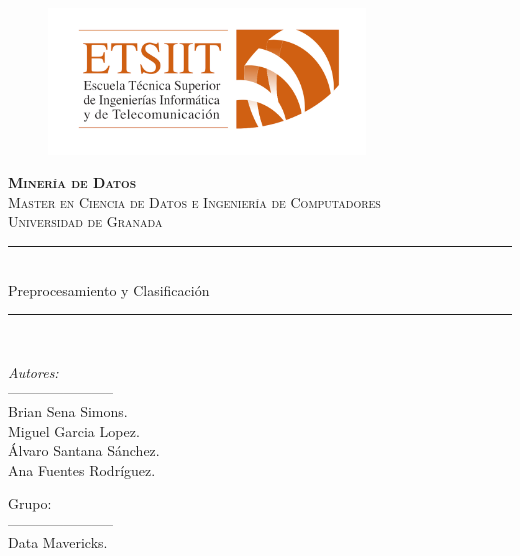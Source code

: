 \documentclass[12pt,letterpaper]{article}
\author{Brian Sena Simons} %
\date{\normalsize\today} %
\newcommand{\horrule}[1]{\rule{\linewidth}{#1}} %
\begin{document}
%
\begin{titlepage}
\begin{figure}[H]
    \vspace{-1.3cm}
    \begin{center}
        \includegraphics[width=0.75\textwidth]{Etsiit}
    \end{center}
\end{figure}
\vspace{1.3cm}
\centering
\normalfont \normalsize
\textsc{\textbf{Minería de Datos} \\ \vspace{.15cm} Master en Ciencia de Datos e Ingeniería de Computadores \\ \vspace{.15cm} Universidad de Granada} \\ [25pt] %
    \horrule{0.5pt} \\[0.4cm] %
    \huge Preprocesamiento y Clasificación\\ %
    \horrule{2pt} \\[0.5cm] %

\begin{minipage}{0.4\textwidth}
    \begin{flushleft}\large
        \emph{Autores:} \\
         ----------------------- \\
        \vspace{.15cm}
        Brian Sena Simons. \\
        Miguel Garcia Lopez. \\
        Álvaro Santana Sánchez. \\ 
        Ana Fuentes Rodríguez.

    \end{flushleft}
\end{minipage}
\begin{minipage}{0.4\textwidth}
    \vspace{-2.2cm}
     \begin{flushright}\large
         Grupo: \\
         ----------------------- \\
         Data Mavericks.
    \end{flushright}
\end{minipage}
\end{titlepage}
\end{document}
